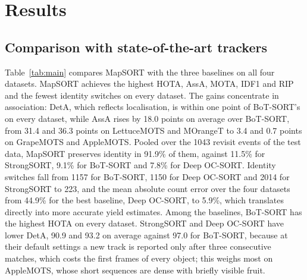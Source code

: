 \documentclass[pdflatex,sn-basic]{sn-jnl}%
\theoremstyle{thmstyleone}%
\begin{document}
\section{Results}\label{sec:results}

\subsection{Comparison with state-of-the-art trackers}\label{sec:res-main}

Table~\ref{tab:main} compares MapSORT with the three baselines on all four datasets. MapSORT achieves the highest HOTA, AssA, MOTA, IDF1 and RIP and the fewest identity switches on every dataset. The gains concentrate in association: DetA, which reflects localisation, is within one point of BoT-SORT's on every dataset, while AssA rises by 18.0 points on average over BoT-SORT, from 31.4 and 36.3 points on LettuceMOTS and MOrangeT to 3.4 and 0.7 points on GrapeMOTS and AppleMOTS. Pooled over the 1043 revisit events of the test data, MapSORT preserves identity in 91.9\% of them, against 11.5\% for StrongSORT, 9.1\% for BoT-SORT and 7.8\% for Deep OC-SORT. Identity switches fall from 1157 for BoT-SORT, 1150 for Deep OC-SORT and 2014 for StrongSORT to 223, and the mean absolute count error over the four datasets from 44.9\% for the best baseline, Deep OC-SORT, to 5.9\%, which translates directly into more accurate yield estimates. Among the baselines, BoT-SORT has the highest HOTA on every dataset. StrongSORT and Deep OC-SORT have lower DetA, 90.9 and 93.2 on average against 97.0 for BoT-SORT, because at their default settings a new track is reported only after three consecutive matches, which costs the first frames of every object; this weighs most on AppleMOTS, whose short sequences are dense with briefly visible fruit.
\end{document}
